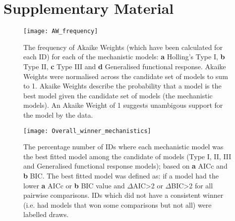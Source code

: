 \documentclass[11pt]{article}
\newcommand{\beginsupplement}{%
        \setcounter{table}{0}
        \renewcommand{\thetable}{S\arabic{table}}%
        \setcounter{figure}{0}
        \renewcommand{\thefigure}{S\arabic{figure}}%
     }
\begin{document}
    \section{Supplementary Material}
    \beginsupplement

        \begin{figure}[htpb]
            \texttt{[image: AW\_frequency]}\label{fig:4}
            \centering
            \caption{The frequency of Akaike Weights (which have been calculated for each ID) for each of the mechanistic models: \textbf{a} Holling's Type I, \textbf{b} Type II, \textbf{c} Type III and \textbf{d} Generalised functional response. Akaike Weights were normalised across the candidate set of models to sum to 1. Akaike Weights describe the probability that a model is the best model given the candidate set of models (the mechanistic models). An Akaike Weight of 1 suggests unambigous support for the model by the data.}
        \end{figure}

        \begin{figure}[htpb]
            \texttt{[image: Overall\_winner\_mechanistics]}\label{fig:2}
            \centering
            \caption{The percentage number of IDs where each mechanistic model was the best fitted model among the candidate of models (Type I, II, III and Generalised functional response models); based on \textbf{a} AICc and \textbf{b} BIC. The best fitted model was defined as: if a model had the lower \textbf{a} AICc or \textbf{b} BIC value and $\Delta$AIC\textgreater2 or $\Delta$BIC\textgreater2 for all pairwise comparisons. IDs which did not have a consistent winner (i.e. had models that won some comparisons but not all) were labelled draws.} 
        \end{figure}
\end{document}
